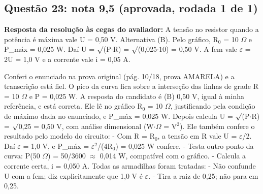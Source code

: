 \documentclass{article}%
\begin{document}
\subsection*{Questão 23: nota 9,5 (aprovada, rodada 1 de 1)}%
\textbf{Resposta da resolução às cegas do avaliador:} A tensão no resistor quando a potência é máxima vale U = 0,50 V. Alternativa (B).\newline%
\newline%
Pelo gráfico, R$_{0}$ = 10 $\Omega$ e P\_máx = 0,025 W. Daí U = $\surd$(P$\cdot$R) = $\surd$(0,025$\cdot$10) = 0,50 V. A fem vale $\varepsilon$ = 2U = 1,0 V e a corrente vale i = 0,05 A.\par %
Conferi o enunciado na prova original (pág. 10/18, prova AMARELA) e a transcrição está fiel. O pico da curva fica sobre a interseção das linhas de grade R = 10 $\Omega$ e P = 0,025 W.\newline%
\newline%
A resposta do candidato é (B) 0,50 V, igual à minha referência, e está correta. Ele lê no gráfico R$_{0}$ = 10 $\Omega$, justificando pela condição de máximo dada no enunciado, e P\_máx = 0,025 W. Depois calcula U = $\surd$(P$\cdot$R) = $\surd$0,25 = 0,50 V, com análise dimensional (W$\cdot$$\Omega$ = V$^2$).\newline%
\newline%
Ele também confere o resultado pelo modelo do circuito:\newline%
{-} Com R = R$_{0}$, a tensão em R vale U = $\varepsilon$/2. Daí $\varepsilon$ = 1,0 V, e P\_máx = $\varepsilon$$^2$/(4R$_{0}$) = 0,025 W confere.\newline%
{-} Testa outro ponto da curva: P(50 $\Omega$) = 50/3600 $\approx$ 0,014 W, compatível com o gráfico.\newline%
{-} Calcula a corrente certa, i = 0,050 A.\newline%
\newline%
Todas as armadilhas foram tratadas:\newline%
{-} Não confunde U com a fem; diz explicitamente que 1,0 V é $\varepsilon$.\newline%
{-} Tira a raiz de 0,25; não para em 0,25.\newline%
\end{document}
